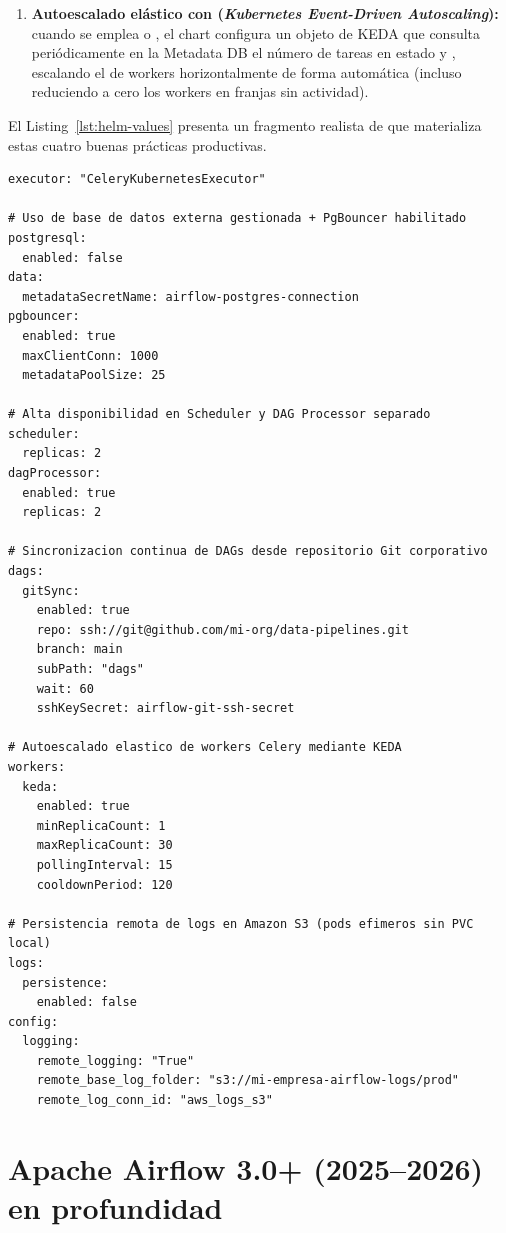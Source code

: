 \begin{enumerate}
  \item \textbf{Autoescalado elástico con  (\textit{Kubernetes Event-Driven Autoscaling}):} cuando se emplea  o , el chart configura un objeto  de KEDA que consulta periódicamente en la Metadata DB el número de tareas en estado  y , escalando el  de workers horizontalmente de forma automática (incluso reduciendo a cero los workers en franjas sin actividad).
\end{enumerate}

El Listing~\ref{lst:helm-values} presenta un fragmento realista de  que materializa estas cuatro buenas prácticas productivas.

\begin{lstlisting}[style=yaml, caption={Extracto productivo de \texttt{values.yaml} para el Helm Chart oficial de Apache Airflow sobre Kubernetes.}, label={lst:helm-values}]
executor: "CeleryKubernetesExecutor"

# Uso de base de datos externa gestionada + PgBouncer habilitado
postgresql:
  enabled: false
data:
  metadataSecretName: airflow-postgres-connection
pgbouncer:
  enabled: true
  maxClientConn: 1000
  metadataPoolSize: 25

# Alta disponibilidad en Scheduler y DAG Processor separado
scheduler:
  replicas: 2
dagProcessor:
  enabled: true
  replicas: 2

# Sincronizacion continua de DAGs desde repositorio Git corporativo
dags:
  gitSync:
    enabled: true
    repo: ssh://git@github.com/mi-org/data-pipelines.git
    branch: main
    subPath: "dags"
    wait: 60
    sshKeySecret: airflow-git-ssh-secret

# Autoescalado elastico de workers Celery mediante KEDA
workers:
  keda:
    enabled: true
    minReplicaCount: 1
    maxReplicaCount: 30
    pollingInterval: 15
    cooldownPeriod: 120

# Persistencia remota de logs en Amazon S3 (pods efimeros sin PVC local)
logs:
  persistence:
    enabled: false
config:
  logging:
    remote_logging: "True"
    remote_base_log_folder: "s3://mi-empresa-airflow-logs/prod"
    remote_log_conn_id: "aws_logs_s3"
\end{lstlisting}

\section{Apache Airflow 3.0+ (2025--2026) en profundidad}\label{sec:airflow-3}

